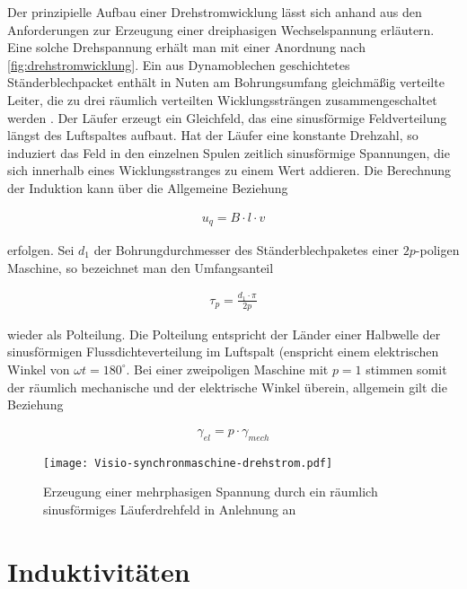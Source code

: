 Der prinzipielle Aufbau einer Drehstromwicklung lässt sich anhand aus den Anforderungen zur Erzeugung einer dreiphasigen Wechselspannung erläutern.
Eine solche Drehspannung erhält man mit einer Anordnung nach \autoref{fig:drehstromwicklung}.
Ein aus Dynamoblechen geschichtetes Ständerblechpacket enthält in Nuten am Bohrungsumfang gleichmäßig verteilte Leiter, die zu drei räumlich verteilten Wicklungssträngen zusammengeschaltet werden \autocite[S.~141]{fischer2009}.
Der Läufer erzeugt ein Gleichfeld, das eine sinusförmige Feldverteilung längst des Luftspaltes aufbaut.
Hat der Läufer eine konstante Drehzahl, so induziert das Feld in den einzelnen Spulen zeitlich sinusförmige Spannungen, die sich innerhalb eines Wicklungsstranges zu einem Wert addieren.
Die Berechnung der Induktion kann über die Allgemeine Beziehung

\begin{align}
u_q = B\cdot l \cdot v
\end{align}

erfolgen.
Sei $d_1$ der Bohrungdurchmesser des Ständerblechpaketes einer $2p$-poligen Maschine, so bezeichnet man den Umfangsanteil

\begin{align}
\tau_p = \frac{d_1 \cdot \pi}{2p}
\end{align}

wieder als Polteilung.
Die Polteilung entspricht der Länder einer Halbwelle der sinusförmigen Flussdichteverteilung im Luftspalt (enspricht einem elektrischen Winkel von $\omega t = 180^{\circ}$.
Bei einer zweipoligen Maschine mit $p=1$ stimmen somit der räumlich mechanische und der elektrische Winkel überein, allgemein gilt die Beziehung \autocite[S.141f.]{fischer2009}

\begin{align}
\gamma_{el} = p\cdot \gamma_{mech}
\end{align}



\begin{figure}[!htb]
\centering
\texttt{[image: Visio-synchronmaschine-drehstrom.pdf]}
\label{fig:drehstromwicklung}
\caption{Erzeugung einer mehrphasigen Spannung durch ein räumlich sinusförmiges Läuferdrehfeld in Anlehnung an \autocite[S.~141]{fischer2009}}
\end{figure}

\section{Induktivitäten}\label{sec:induktiv}


